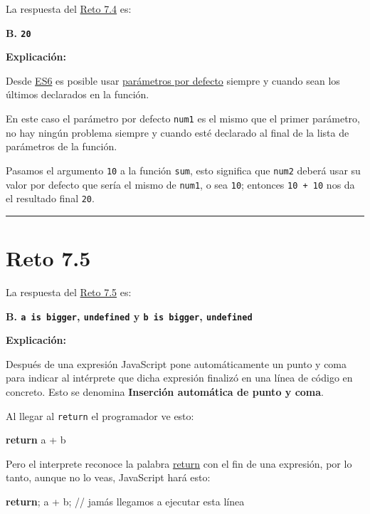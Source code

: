 \documentclass[
  letterpaper,
  DIV=11,
  numbers=noendperiod]{scrreprt}
\newenvironment{Shaded}{\begin{snugshade}}{\end{snugshade}}
\newcommand{\CommentTok}[1]{\textcolor[rgb]{0.37,0.37,0.37}{#1}}
\newcommand{\ControlFlowTok}[1]{\textcolor[rgb]{0.00,0.23,0.31}{\textbf{#1}}}
\newcommand{\NormalTok}[1]{\textcolor[rgb]{0.00,0.23,0.31}{#1}}
\newcommand{\OperatorTok}[1]{\textcolor[rgb]{0.37,0.37,0.37}{#1}}
\begin{document}
La respuesta del \hyperref[sec-cap7-reto4]{Reto 7.4} es:

\textbf{B. \texttt{20}}

\textbf{Explicación:}

Desde \hyperref[glos-es6]{ES6} es posible usar
\hyperref[glos-parametros_por_defecto]{parámetros por defecto} siempre y
cuando sean los últimos declarados en la función.

En este caso el parámetro por defecto \texttt{num1} es el mismo que el
primer parámetro, no hay ningún problema siempre y cuando esté declarado
al final de la lista de parámetros de la función.

Pasamos el argumento \texttt{10} a la función \texttt{sum}, esto
significa que \texttt{num2} deberá usar su valor por defecto que sería
el mismo de \texttt{num1}, o sea \texttt{10}; entonces
\texttt{10\ +\ 10} nos da el resultado final \texttt{20}.

\begin{center}\rule{0.5\linewidth}{0.5pt}\end{center}

\section{Reto 7.5}\label{sec-sol-cap7-reto5}

La respuesta del \hyperref[sec-cap7-reto5]{Reto 7.5} es:

\textbf{B. \texttt{a\ is\ bigger}, \texttt{undefined} y
\texttt{b\ is\ bigger}, \texttt{undefined}}

\textbf{Explicación:}

Después de una expresión JavaScript pone automáticamente un punto y coma
para indicar al intérprete que dicha expresión finalizó en una línea de
código en concreto. Esto se denomina \textbf{Inserción automática de
punto y coma}.

Al llegar al \texttt{return} el programador ve esto:

\begin{Shaded}
\begin{Highlighting}[]
\ControlFlowTok{return} 
\NormalTok{a }\OperatorTok{+}\NormalTok{ b}
\end{Highlighting}
\end{Shaded}

Pero el interprete reconoce la palabra \hyperref[glos-return]{return}
con el fin de una expresión, por lo tanto, aunque no lo veas, JavaScript
hará esto:

\begin{Shaded}
\begin{Highlighting}[]
  \ControlFlowTok{return}\OperatorTok{;}
\NormalTok{  a }\OperatorTok{+}\NormalTok{ b}\OperatorTok{;} \CommentTok{// jamás llegamos a ejecutar esta línea}
\end{Highlighting}
\end{Shaded}
\end{document}

